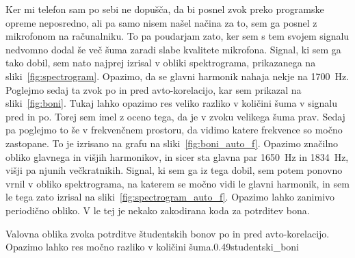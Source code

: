 \documentclass{porocilo}
\begin{document}
Ker mi telefon sam po sebi ne dopušča, da bi posnel zvok preko programske opreme neposredno, ali pa samo nisem našel načina za to, sem ga posnel z mikrofonom na računalniku. To pa poudarjam zato, ker sem s tem svojem signalu nedvomno dodal še več šuma zaradi slabe kvalitete mikrofona. Signal, ki sem ga tako dobil, sem nato najprej izrisal v obliki spektrograma, prikazanega na sliki~\ref{fig:spectrogram}. Opazimo, da se glavni harmonik nahaja nekje na \SI{1700}{\hertz}. Poglejmo sedaj ta zvok po in pred avto-korelacijo, kar sem prikazal na sliki~\ref{fig:boni}. Tukaj lahko opazimo res veliko razliko v količini šuma v signalu pred in po. Torej sem imel z oceno tega, da je v zvoku velikega šuma prav. Sedaj pa poglejmo to še v frekvenčnem prostoru, da vidimo katere frekvence so močno zastopane. To je izrisano na grafu na sliki~\ref{fig:boni_auto_f}.
Opazimo značilno obliko glavnega in višjih harmonikov, in sicer sta glavna par \SI{1650}{\hertz} in \SI{1834}{\hertz}, višji pa njunih večkratnikih. Signal, ki sem ga iz tega dobil, sem potem ponovno vrnil v obliko spektrograma, na katerem se močno vidi le glavni harmonik, in sem le tega zato izrisal na sliki~\ref{fig:spectrogram_auto_f}. Opazimo lahko zanimivo periodično obliko. V le tej je nekako zakodirana koda za potrditev bona.


\begin{multifig}{2}{Valovna oblika zvoka potrditve študentskih bonov po in pred avto-korelacijo. Opazimo lahko res močno razliko v količini šuma.}{0.49}{studentski_boni}
\end{multifig}


\end{document}
